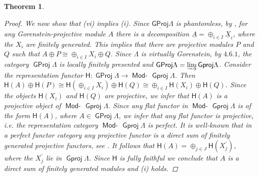 \documentclass[oneside, a4paper,reqno]{amsart}
\numberwithin{equation}{section}
\newtheorem{thm}{Theorem}[section]
\theoremstyle{definition}
\begin{document}
\begin{thm}
\begin{proof}
We now show that (vi) implies (i). Since
${\operatorname{\underline{\mathsf{GProj}}}\nolimits}\Lambda$ is phantomless, by \cite[Theorem 9.3]{B:3cats}, for
any Gorenstein-projective module $A$ there is a decomposition ${\underline A}
= \oplus_{i\in I}{\underline X}_{i}$, where the $X_{i}$ are finitely
generated. This implies that there are projective modules $P$ and
$Q$ such that $A \oplus P \cong \oplus_{i\in I}X_{i} \oplus Q$.
Since $\Lambda$ is virtually Gorenstein, by $4.6.1$, the category
${\operatorname{\mathsf{GProj}}\nolimits}\Lambda$ is locally finitely presented and ${\operatorname{\mathsf{GProj}}\nolimits}\Lambda =
\operatorname*{\varinjlim}{\operatorname{\mathsf{Gproj}}\nolimits}\Lambda$. Consider the representation functor
$\mathsf{H} : {\operatorname{\mathsf{GProj}}\nolimits}\Lambda {\longrightarrow} \operatorname*{\mathsf{Mod}-\!}{\operatorname{\mathsf{Gproj}}\nolimits}\Lambda$. Then
$\mathsf{H}(A) \oplus \mathsf{H}(P) \cong \mathsf{H}(\oplus_{i\in
I}X_{i}) \oplus \mathsf{H}(Q) \cong \oplus_{i\in I}\mathsf{H}(X_{i})
\oplus \mathsf{H}(Q)$. Since the objects $\mathsf{H}(X_{i})$ and
$\mathsf{H}(Q)$ are projective, we infer that  $\mathsf{H}(A)$ is a
projective object of $\operatorname*{\mathsf{Mod}-\!}{\operatorname{\mathsf{Gproj}}\nolimits}\Lambda$. Since any flat functor in
$\operatorname*{\mathsf{Mod}-\!}{\operatorname{\mathsf{Gproj}}\nolimits}\Lambda$ is of the form $\mathsf{H}(A)$, where $A\in
{\operatorname{\mathsf{GProj}}\nolimits}\Lambda$, we infer that any flat functor is projective, i.e.
the representation category $\operatorname*{\mathsf{Mod}-\!}{\operatorname{\mathsf{Gproj}}\nolimits}\Lambda$ is perfect. It is
well-known
 that in a perfect functor category any projective functor is a
 direct sum of finitely generated projective functors, see
 \cite{JL}. It follows that $\mathsf{H}(A) = \oplus_{j\in
 J}\mathsf{H}(X^{\prime}_{j})$, where the $X^{\prime}_{j}$ lie in ${\operatorname{\mathsf{Gproj}}\nolimits}\Lambda$. Since $\mathsf{H}$ is fully faithful
 we conclude that $A$ is a direct sum of finitely generated modules
 and (i) holds. 


\end{proof}
\end{thm}
\end{document}
